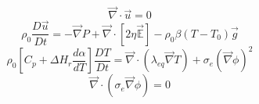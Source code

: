 \documentclass[12pt, a4paper, french, BCOR = 0pt, DIV = 10]{scrartcl}
\begin{document}
    \begin{figure}[H]
        \centering
        \begin{equation}
            \vec {\nabla} \cdot \vec{u} = 0
            \tag{Conservation de la masse}
            \label{eq:ConsMasse}
        \end{equation}
        \begin{equation}
            \rho_{0} \frac{D\vec{u}}{Dt} = - \vec {\nabla} P + \vec {\nabla} \cdot [ 2 \eta \vec{\mathbb{E}}] - \rho_{0} \beta (T-T_{0}) \vec{g}
            \tag{Conservation de la quantité de mouvement}
            \label{eq:ConsQteMvt}
        \end{equation}
        \begin{equation}
            \rho_{0} \left[ C_{p}+ \Delta H_{r} \frac{d\alpha}{dT} \right] \frac{DT}{Dt} = \vec {\nabla} \cdot  (\lambda_{eq} \vec{\nabla} T ) + \sigma_{e} (\vec \nabla\phi)^2
            \tag{Conservation de l'enthalpie}
            \label{eq:ConsEnth}
        \end{equation}
        \begin{equation}
            \vec{\nabla} \cdot (\sigma_{e} \vec{\nabla} \phi) = 0
            \tag{Conservation du flux électrique}
            \label{eq:ConsFluxElec}
        \end{equation}
        
    \end{figure}
\end{document}
